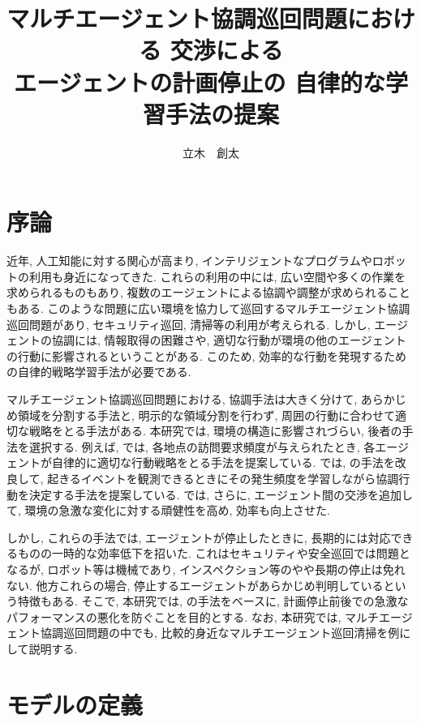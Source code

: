 \documentclass[10pt,a4j,twocolumn]{jsarticle}
\title{マルチエージェント協調巡回問題における
交渉による\\エージェントの計画停止の
自律的な学習手法の提案}%
\author{立木　創太}
\begin{document}
\nocite{*}

\maketitle


\section{序論}
近年, 人工知能に対する関心が高まり, インテリジェントなプログラムやロボットの利用も身近になってきた. これらの利用の中には, 広い空間や多くの作業を求められるものもあり, 複数のエージェントによる協調や調整が求められることもある. このような問題に広い環境を協力して巡回するマルチエージェント協調巡回問題があり, セキュリティ巡回, 清掃等の利用が考えられる. しかし, エージェントの協調には, 情報取得の困難さや, 適切な行動が環境の他のエージェントの行動に影響されるということがある. このため, 効率的な行動を発現するための自律的戦略学習手法が必要である.  
\par
マルチエージェント協調巡回問題における, 協調手法は大きく分けて, あらかじめ領域を分割する手法と, 明示的な領域分割を行わず, 周囲の行動に合わせて適切な戦略をとる手法\cite{yoneda2013autonomous}\cite{2015杉山LD}\cite{KAIS2019}がある. 本研究では, 環境の構造に影響されづらい, 後者の手法を選択する. 例えば, \cite{yoneda2013autonomous}では, 各地点の訪問要求頻度が与えられたとき, 各エージェントが自律的に適切な行動戦略をとる手法を提案している. \cite{2015杉山LD}では, \cite{yoneda2013autonomous}の手法を改良して, 起きるイベントを観測できるときにその発生頻度を学習しながら協調行動を決定する手法を提案している. \cite{KAIS2019}では, さらに, エージェント間の交渉を追加して, 環境の急激な変化に対する頑健性を高め, 効率も向上させた.
\par
しかし, これらの手法では, エージェントが停止したときに, 長期的には対応できるものの一時的な効率低下を招いた. これはセキュリティや安全巡回では問題となるが, ロボット等は機械であり, インスペクション等のやや長期の停止は免れない. 他方これらの場合, 停止するエージェントがあらかじめ判明しているという特徴もある. そこで, 本研究では, \cite{KAIS2019}の手法をベースに, 計画停止前後での急激なパフォーマンスの悪化を防ぐことを目的とする. なお, 本研究では, マルチエージェント協調巡回問題の中でも, 比較的身近なマルチエージェント巡回清掃を例にして説明する.

\section{モデルの定義}
\end{document}
